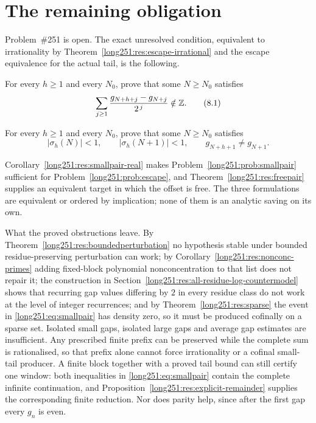 \documentclass[11pt]{article}
\begin{document}
\section{The remaining obligation}\label{long251:sec:open}

Problem~\#251 is open.  The exact unresolved condition, equivalent to
irrationality by Theorem~\ref{long251:res:escape-irrational} and the escape
equivalence for the actual tail, is the following.

\begin{problem}\label{long251:prob:escape}
For every $h\ge1$ and every $N_0$, prove that some $N\ge N_0$ satisfies
\[
 \sum_{j\ge1}\frac{g_{N+h+j}-g_{N+j}}{2^{\,j}}\notin\Z .
\tag{8.1}\label{long251:eq:shift-escape}
\]
\end{problem}

\begin{problem}\label{long251:prob:smallpair}
For every $h\ge1$ and every $N_0$, prove that some $N\ge N_0$ satisfies
\[
 \bigl|\sigma_h(N)\bigr|<1,\qquad
 \bigl|\sigma_h(N+1)\bigr|<1,\qquad
 g_{N+h+1}\ne g_{N+1} .
\tag{8.2}\label{long251:eq:smallpair}
\]
\end{problem}

Corollary~\ref{long251:res:smallpair-real} makes Problem~\ref{long251:prob:smallpair}
sufficient for Problem~\ref{long251:prob:escape}, and Theorem~\ref{long251:res:freepair}
supplies an equivalent target in which the offset is free.  The three
formulations are equivalent or ordered by implication;
none of them is an analytic saving on its own.

What the proved obstructions leave.  By Theorem~\ref{long251:res:boundedperturbation}
no hypothesis stable under bounded residue-preserving perturbation can work;
by Corollary~\ref{long251:res:nonconc-primes} adding fixed-block polynomial
nonconcentration to that list does not repair it; the construction in
Section~\ref{long251:res:all-residue-log-countermodel} shows that recurring gap
values differing by $2$ in every residue class do not work at the level of
integer recurrences; and by
Theorem~\ref{long251:res:sparse} the event in \eqref{long251:eq:smallpair} has density zero, so
it must be produced cofinally on a sparse set.  Isolated small gaps, isolated
large gaps and average gap estimates are insufficient.  Any prescribed finite
prefix can be preserved while the complete sum is rationalised, so that prefix
alone cannot force irrationality or a cofinal small-tail producer.  A finite
block together with a proved tail bound can still certify one window: both
inequalities in \eqref{long251:eq:smallpair} contain the complete infinite
continuation, and Proposition~\ref{long251:res:explicit-remainder} supplies the
corresponding finite reduction.  Nor does
parity help, since after the first gap every $g_n$ is even.
\end{document}
